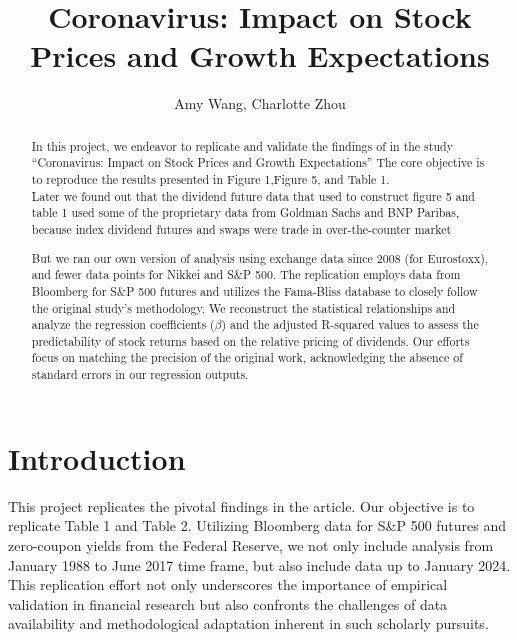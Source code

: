 \documentclass{article}
\title{Coronavirus: Impact on Stock Prices and Growth Expectations}
\author{Amy Wang, Charlotte Zhou}
\begin{document}
\maketitle

\begin{abstract}\noindent
In this project, we endeavor to replicate and validate the 
findings of \cite{gormsen2020coronavirus} in the study ``Coronavirus: Impact on Stock Prices and Growth Expectations''
 The core objective is to reproduce the results 
presented in Figure 1,Figure 5, and Table 1.\\
Later we found out that the dividend future data that used to construct figure 5 and table 1 used
 some of the proprietary data from Goldman Sachs and BNP Paribas, because
  index dividend futures and swaps were trade in over-the-counter market \cite{van2013equity}

But we ran our own version of analysis using exchange data since 2008 (for Eurostoxx), 
and fewer data points for Nikkei and S\&P 500.
\newline
\newline
The replication employs data from Bloomberg for S\&P 500 futures and 
utilizes the Fama-Bliss database to closely follow the original study's 
methodology. We reconstruct the statistical relationships and analyze 
the regression coefficients (\( \beta \)) and the adjusted R-squared 
values to assess the predictability of stock returns based on the 
relative pricing of dividends. Our efforts focus on matching the 
precision of the original work, acknowledging the absence of standard
 errors in our regression outputs.
\end{abstract}

\section{Introduction}
This project replicates the pivotal findings in the article. Our 
objective is to replicate Table 1 and Table 2. Utilizing Bloomberg 
data for S\&P 500 futures and zero-coupon yields from the Federal 
Reserve, we not only include analysis from January 1988 to June 
2017 time frame, but also include data up to January 2024. This 
replication effort not only underscores the importance of empirical 
validation in financial research but also confronts the challenges 
of data availability and methodological adaptation inherent in such 
scholarly pursuits.
\end{document}
